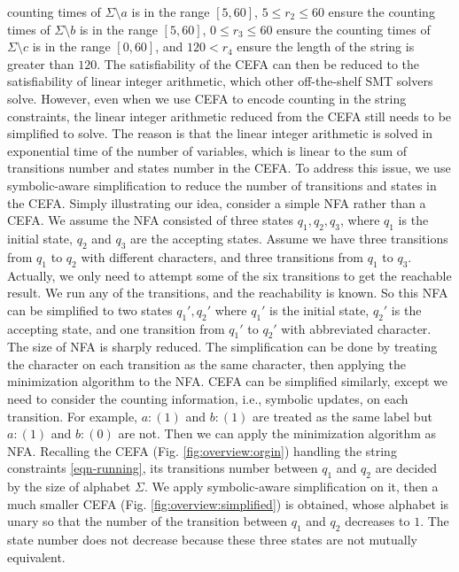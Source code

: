 {counting times of $\Sigma \setminus a$ is in the range $[5, 60]$, $5\leq r_2\leq 60$ ensure the counting times of $\Sigma \setminus b$ is in the range $[5, 60]$, $0\leq r_3\leq 60$ ensure the counting times of $\Sigma \setminus c$ is in the range $[0, 60]$, and $120 < r_4$ ensure the length of the string is greater than $120$. The satisfiability of the CEFA can then be reduced to the satisfiability of linear integer arithmetic, which other off-the-shelf SMT solvers solve. \newline
However, even when we use CEFA to encode counting in the string constraints, the linear integer arithmetic reduced from the CEFA still needs to be simplified to solve. The reason is that the linear integer arithmetic is solved in exponential time of the number of variables, which is linear to the sum of transitions number and states number in the CEFA. To address this issue, we use symbolic-aware simplification to reduce the number of transitions and states in the CEFA. Simply illustrating our idea, consider a simple NFA rather than a CEFA. We assume the NFA consisted of three states $q_1, q_2, q_3$, where $q_1$ is the initial state, $q_2$ and $q_3$ are the accepting states. Assume we have three transitions from $q_1$ to $q_2$ with different characters, and three transitions from $q_1$ to $q_3$. Actually, we only need to attempt some of the six transitions to get the reachable result. We run any of the transitions, and the reachability is known. So this NFA can be simplified to two states $q_1', q_2'$ where $q_1'$ is the initial state, $q_2'$ is the accepting state, and one transition from $q_1'$ to $q_2'$ with abbreviated character. The size of NFA is sharply reduced. The simplification can be done by treating the character on each transition as the same character, then applying the minimization algorithm to the NFA. CEFA can be simplified similarly, except we need to consider the counting information, i.e., symbolic updates, on each transition. For example, $a:(1)$ and $b:(1)$ are treated as the same label but $a:(1)$ and $b:(0)$ are not. Then we can apply the minimization algorithm as NFA. Recalling the CEFA (Fig. \ref{fig:overview:orgin}) handling the string constraints \ref{eqn-running}, its transitions number between $q_1$ and $q_2$ are decided by the size of alphabet $\Sigma$. We apply symbolic-aware simplification on it, then a much smaller CEFA (Fig. \ref{fig:overview:simplified}) is obtained, whose alphabet is unary so that the number of the transition between $q_1$ and $q_2$ decreases to $1$. The state number does not decrease because these three states are not mutually equivalent. 

}
